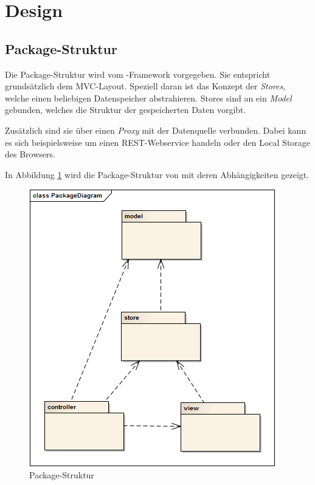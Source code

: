 \section{Design}

\subsection{Package-Struktur}

Die Package-Struktur wird vom -Framework vorgegeben. Sie entspricht grundsätzlich dem \gls{MVC}-Layout.
Speziell daran ist das Konzept der \emph{Stores}, welche einen beliebigen Datenspeicher abstrahieren.
Stores sind an ein \emph{Model} gebunden, welches die Struktur der gespeicherten Daten vorgibt.

Zusätzlich sind sie über einen \emph{Proxy} mit der Datenquelle verbunden.
Dabei kann es sich beispielsweise um einen \gls{REST}-Webservice handeln oder den \gls{Local Storage} des Browsers.

In Abbildung \ref{image-kort-packagediagram} wird die Package-Struktur von \kort{} mit deren Abhängigkeiten gezeigt.

\begin{figure}[H]
	\centering
	\includegraphics[scale=0.7]{images/uml/kort-packagediagram}
	\caption{Package-Struktur}
	\label{image-kort-packagediagram}
\end{figure}

